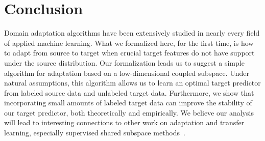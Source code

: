 \section{Conclusion}
\label{sec:conclusion}

Domain adaptation algorithms have been extensively studied in nearly
every field of applied machine learning.  What we formalized here, for
the first time, is how to adapt from source to target when crucial
target features do not have support under the source distribution.
Our formalization leads us to suggest a simple algorithm for
adaptation based on a low-dimensional coupled subspace.  Under natural
assumptions, this algorithm allows us to learn an optimal target
predictor from labeled source data and unlabeled target data.
Furthermore, we show that incorporating small amounts of labeled
target data can improve the stability of our target predictor, both
theoretically and empirically.  We believe our analysis will lead to
interesting connections to other work on adaptation and transfer
learning, especially supervised shared subspace
methods~\cite{argyriou07,daume07}.
